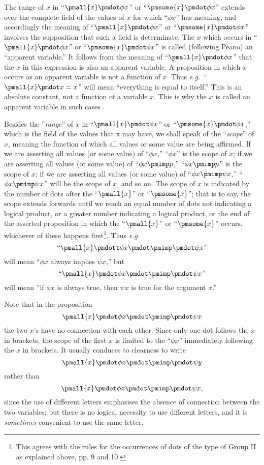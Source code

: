 \documentclass[letterpaper,12pt,openany,leqno]{book}
\newcommand{\pagefirst}[1]{\marginnote[\boxed{\text{#1}}]{\boxed{\text{#1}}}}
\begin{document}
The range of $x$ in ``$\pmall{x}\pmdot \phi x$'' or ``$\pmsome{x}\pmdot \phi x$'' extends over the complete field of the values of $x$ for which ``$\phi x$'' has meaning, and accordingly the meaning of ``$\pmall{x}\pmdot \phi x$'' or ``$\pmsome{x}\pmdot \phi x$'' involves the supposition that such a field is determinate. The $x$ which occurs in ``$\pmall{x}\pmdot \phi x$'' or ``$\pmsome{x}\pmdot \phi x$'' is called (following Peano) an ``apparent variable.'' It follows from the meaning of ``$\pmall{x}\pmdot \phi x$'' that the $x$ in this expression is also an apparent variable. A proposition in which $x$ occurs as an apparent variable is not a function of $x$. Thus \textit{e.g.}\ ``$\pmall{x}\pmdot x = x$'' will mean ``everything is equal to itself.'' This is an absolute constant, not a function of a variable $x$. This is why the $x$ is called an apparent variable in such cases .

Besides the ''\textit{range}'' of $x$ in ``$\pmall{x}\pmdot \phi x$'' or ``$\pmsome{x}\pmdot \phi x$,'' which is the field of the values that x may have, we shall speak of the ``\textit{scope}'' of $x$, meaning the function of which all values or some value are being affirmed. If we are asserting all values (or some value) of ``$\phi x$,'' ``$\phi x$'' is the scope of $x$; if we are asserting all values (or some value) of ``$\phi x \pmimp p$,'' ``$\phi x \pmimp p$'' is the scope of $x$; if we are asserting all values (or some value) of ``$\phi x\pmimp \psi x$,'' ``$\phi x\pmimp \psi x$'' will be the scope of $x$, and so on. The scope of $x$ is indicated by the number of dots after the ``$\pmall{x}$'' or ``$\pmsome{x}$''; that is to say, the scope extends forwards until we reach an equal number of dots not indicating a logical product, or a greater number indicating a logical product, or the end of the asserted proposition in which the ``$\pmall{x}$'' or ``$\pmsome{x}$'' occurs, whichever of these happens first\footnote{This agrees with the rules for the occurrences of dots of the type of Group II as explained above, pp. 9 and 10.}. Thus \textit{e.g.}\
\[ 
	\text{``}\pmall{x}\pmdott \phi x \pmdot \pmimp\pmdot \psi x\text{''}
\]
will mean ``$\phi x$ always implies $\psi x$,'' but
\[ 
	\text{``}\pmall{x}\pmdot \phi x \pmdot \pmimp\pmdot \psi x\text{''}
\]
will mean ''if $\phi x$ is always true, then $\psi x$ is true for the argument $x$.''

Note that in the proposition
\[ 
	\pmall{x}\pmdot \phi x \pmdot \pmimp\pmdot \psi x
\]
\pagefirst{18} the two $x$'s have no connection with each other. Since only one dot follows the $x$ in brackets, the scope of the first $x$ is limited to the ``$\phi x$'' immediately following the $x$ in brackets. It usually conduces to clearness to write
\[ 
\pmall{x}\pmdot \phi x \pmdot \pmimp\pmdot \psi y
\]
rather than 
\[ 
\pmall{x}\pmdot \phi x \pmdot \pmimp\pmdot \psi x,
\]
since the use of different letters emphasises the absence of connection between the two variables; but there is no logical necessity to use different letters, and it is \textit{sometimes} convenient to use the same letter.
\end{document}
